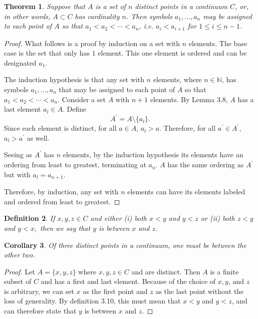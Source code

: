 \documentclass{amsart}
\newtheorem{theorem}{Theorem}
\newtheorem{definition}[theorem]{Definition}
\newtheorem{corollary}[theorem]{Corollary}
\newcommand{\N}{\mathbb N}
\newcommand{\1}{\mathds{1}}
\def \N {{\mathbb {N}}}
\numberwithin{equation}{section}
\numberwithin{theorem}{section}
\begin{document}
\begin{theorem}  Suppose that $A$ is a set of $n$ distinct points in a continuum $C$, or, in other words, $A \subset C$ has cardinality $n$.  Then symbols $a_1, \dotsc, a_n$ may be assigned to each point of $A$ so that $a_1 < a_2 < \dotsm < a_n$, i.e. $a_i < a_{i + 1}$ for $1 \leq i \leq n - 1$.
\end{theorem}

\begin{proof}
	What follows is a proof by induction on a set with $n$ elements. The base case is the set that only has $1$ element. This one element is ordered and can be designated $a_1$. 
	
	The induction hypothesis is that any set with $n$ elements, where $n\in\N$, has symbols $a_1, \dotsc, a_n$ that may be assigned to each point of $A$ so that $a_1 < a_2 < \dotsm < a_n$. Consider a set $A$ with $n+1$ elements. By Lemma 3.8, $A$ has a last element $a_l\in A$. Define $$A^\prime=A\setminus\{a_l\}.$$ Since each element is distinct, for all $a\in A$, $a_l>a$. Therefore, for all $a^\prime\in A^\prime$, $a_l>a^\prime$ as well. 
	
	Seeing as $A^\prime$ has $n$ elements, by the induction hypothesis its elements have an ordering from least to greatest, terminating at $a_n$. $A$ has the same ordering as $A^\prime$ but with $a_l = a_{n+1}$. 
	
	Therefore, by induction, any set with $n$ elements can have its elements labeled and ordered from least to greatest.
\end{proof}

\begin{definition}  If $x, y, z \in C$ and either (i) both $x < y$ and $y < z$ or (ii) both $z<y$ and $y<x,$ then we say that $y$ is \emph{between} $x$ and $z$.
\end{definition}

\begin{corollary}  Of three distinct points in a continuum, one must be between the other two.
\end{corollary}

\begin{proof}
	Let $A = \{x,y,z\}$ where $x, y, z \in C$ and are distinct. Then $A$ is a finite subset of $C$ and has a first and last element. Because of the choice of $x,y\text{, and }z$ is arbitrary, we can set $x$ as the first point and $z$ as the last point without the loss of generality. By definition 3.10, this must mean that $x < y$ and $y < z$, and can therefore state that $y$ is between $x$ and $z$. 
\end{proof}
\end{document}
